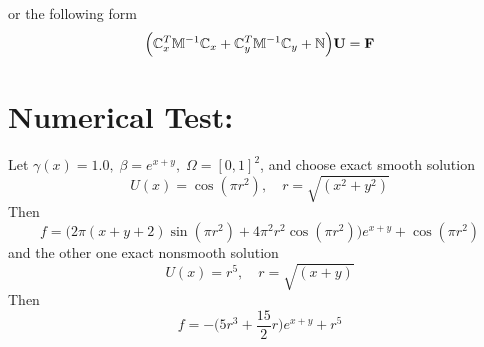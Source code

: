 \documentclass[10pt,reqno, final]{amsart}
\begin{document}
or the following form
\begin{equation*}
  \Big( \mathbb{C}_x^T  \mathbb{M}^{-1}  \mathbb{C}_x + \mathbb{C}_y^T   \mathbb{M}^{-1} \mathbb{C}_y  +\mathbb{N}  \Big)  {\bf U}= {\bf F}
\end{equation*}



\section{Numerical Test:}
Let $\gamma(x)=1.0, \;\beta = e^{x+y},\; \Omega = [0,1]^2$, and choose exact smooth solution
\begin{equation}
U(x)=\cos(\pi r^2),\quad r=\sqrt{(x^2+y^2)}
\end{equation}
Then
\begin{equation}
f = \Big( 2\pi(x+y+2)\sin(\pi r^2)+4\pi^2r^2\cos(\pi r^2) \Big)e^{x+y} + \cos(\pi r^2)
\end{equation}
and the other one exact nonsmooth solution
\begin{equation}
U(x)=r^5 ,\quad r=\sqrt{(x+y)}
\end{equation}
Then
\begin{equation}
f = -\Big(  5r^3 + \frac{15}{2}r  \Big)e^{x+y} + r^5
\end{equation}
\end{document}
